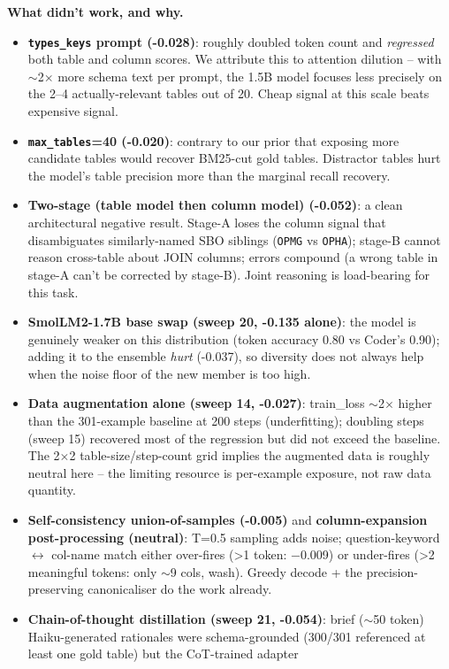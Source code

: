 \documentclass[10pt]{article}
\begin{document}
\textbf{What didn't work, and why.}
\begin{itemize}
\item \textbf{\texttt{types\_keys} prompt (-0.028)}: roughly doubled token count
and \emph{regressed} both table and column scores. We attribute this to attention
dilution -- with $\sim$2$\times$ more schema text per prompt, the 1.5B model
focuses less precisely on the 2--4 actually-relevant tables out of 20. Cheap
signal at this scale beats expensive signal.
\item \textbf{\texttt{max\_tables}=40 (-0.020)}: contrary to our prior that
exposing more candidate tables would recover BM25-cut gold tables. Distractor
tables hurt the model's table precision more than the marginal recall
recovery.
\item \textbf{Two-stage (table model then column model) (-0.052)}: a clean
architectural negative result. Stage-A loses the column signal that
disambiguates similarly-named SBO siblings (\texttt{OPMG} vs \texttt{OPHA});
stage-B cannot reason cross-table about JOIN columns; errors compound (a wrong
table in stage-A can't be corrected by stage-B). Joint reasoning is load-bearing
for this task.
\item \textbf{SmolLM2-1.7B base swap (sweep 20, -0.135 alone)}: the model is
genuinely weaker on this distribution (token accuracy 0.80 vs Coder's 0.90);
adding it to the ensemble \emph{hurt} (-0.037), so diversity does not always
help when the noise floor of the new member is too high.
\item \textbf{Data augmentation alone (sweep 14, -0.027)}: train\_loss
$\sim$2$\times$ higher than the 301-example baseline at 200 steps
(underfitting); doubling steps (sweep 15) recovered most of the regression
but did not exceed the baseline. The 2$\times$2 table-size/step-count
grid implies the augmented data is roughly neutral here -- the limiting
resource is per-example exposure, not raw data quantity.
\item \textbf{Self-consistency union-of-samples (-0.005)} and
\textbf{column-expansion post-processing (neutral)}: T=0.5 sampling
adds noise; question-keyword $\leftrightarrow$ col-name match either
over-fires (\textgreater 1 token: $-$0.009) or under-fires
(\textgreater 2 meaningful tokens: only $\sim$9 cols, wash). Greedy
decode + the precision-preserving canonicaliser do the work already.
\item \textbf{Chain-of-thought distillation (sweep 21, -0.054)}: brief
($\sim$50 token) Haiku-generated rationales were schema-grounded
(300/301 referenced at least one gold table) but the CoT-trained adapter

\end{itemize}
\end{document}
